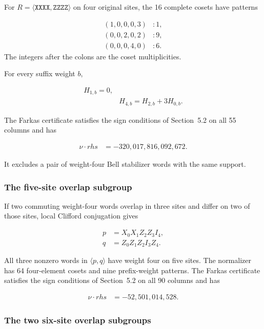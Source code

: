 \documentclass[11pt]{article}
\begin{document}
For \(R=\langle \mathtt{XXXX},\mathtt{ZZZZ} \rangle\) on four original sites, the 16 complete cosets have patterns

\[
\begin{aligned}
(1,0,0,0,3)&:1, \\
(0,0,2,0,2)&:9, \\
(0,0,0,4,0)&:6.
\end{aligned}
\]
The integers after the colons are the coset multiplicities.

For every suffix weight \(b\),

\[
\begin{aligned}
H_{1,b}=0, \\
& H_{4,b}=H_{2,b}+3H_{0,b}.
\end{aligned}
\]

The Farkas certificate satisfies the sign conditions of Section~5.2 on all 55 columns and has

\[
\begin{aligned}
\nu \cdot rhs &=-320{,}017{,}816{,}092{,}672.
\end{aligned}
\]

It excludes a pair of weight-four Bell stabilizer words with the same support.

\subsubsection{The five-site overlap subgroup}\label{the-five-site-overlap-subgroup}

If two commuting weight-four words overlap in three sites and differ on two of those sites, local Clifford conjugation gives

\[
\begin{aligned}
p &=X_{0} X_{1} Z_{2} Z_{3} I_{4}, \\
q &=Z_{0} Z_{1} Z_{2} I_{3} Z_{4}.
\end{aligned}
\]

All three nonzero words in \(\langle p,q \rangle\) have weight four on five sites. The normalizer has 64 four-element cosets and nine prefix-weight patterns. The Farkas certificate satisfies the sign conditions of Section~5.2 on all 90 columns and has

\[
\begin{aligned}
\nu \cdot rhs &=-52{,}501{,}014{,}528.
\end{aligned}
\]

\subsubsection{The two six-site overlap subgroups}\label{the-two-six-site-overlap-subgroups}
\end{document}
